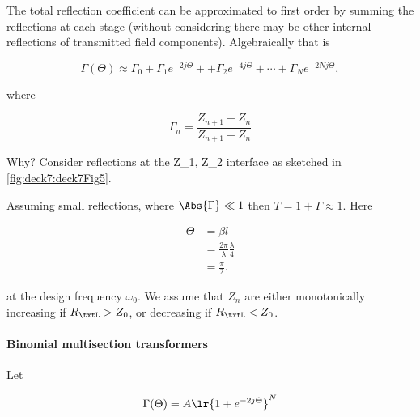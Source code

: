 The total reflection coefficient can be approximated to first order by summing the reflections at each stage (without considering there may be other internal reflections of transmitted field components).  Algebraically that is

\begin{equation}\label{eqn:uwavesDeck7MultisectionTransformersCore:60}
\Gamma(\Theta) \approx \Gamma_0
+ \Gamma_1 e^{-2 j \Theta} +
+ \Gamma_2 e^{-4 j \Theta} +  \cdots
+ \Gamma_N e^{-2 N j \Theta},
\end{equation}

where

\begin{equation}\label{eqn:uwavesDeck7MultisectionTransformersCore:80}
\Gamma_n = \frac{Z_{n+1} - Z_n}{Z_{n+1} + Z_n}
\end{equation}

Why?  Consider reflections at the Z_1, Z_2 interface as sketched in \cref{fig:deck7:deck7Fig5}.


Assuming small reflections, where \( \Abs{\Gamma} \ll 1 \) then \( T = 1 + \Gamma \approx 1 \).  Here

\begin{equation}\label{eqn:uwavesDeck7MultisectionTransformersCore:100}
\begin{aligned}
\Theta
&= \beta l
\\ &= \frac{2 \pi}{\lambda} \frac{\lambda}{4}
\\ &= \frac{\pi}{2}.
\end{aligned}
\end{equation}

at the design frequency \( \omega_0 \).  We assume that \( Z_n \) are either monotonically increasing if \( R_\txtL > Z_0 \), or decreasing if \( R_\txtL < Z_0 \).

\paragraph{Binomial multisection transformers}

Let

\begin{equation}\label{eqn:uwavesDeck7MultisectionTransformersCore:120}
\Gamma(\Theta) = A \lr{ 1 + e^{-2 j \Theta} }^N
\end{equation}

